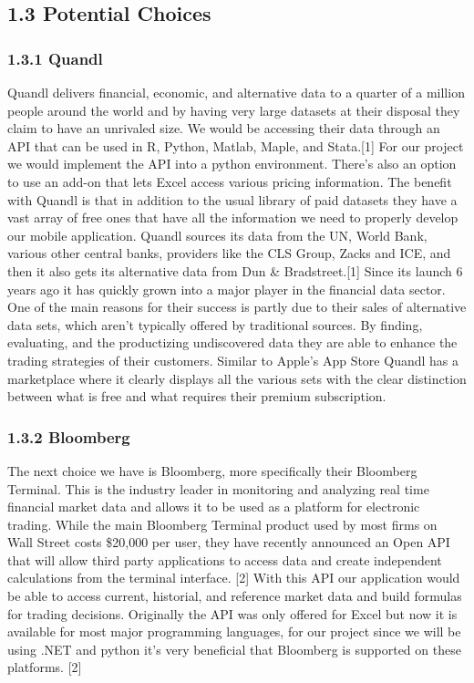 \documentclass[onecolumn, draftclsnofoot,10pt, compsoc]{IEEEtran}
\begin{document}
\subsection{1.3 Potential Choices}

\subsubsection{1.3.1 Quandl}
Quandl delivers financial, economic, and alternative data to a quarter of a million people around the world and by having very large datasets at their disposal they claim to have an unrivaled size. We would be accessing their data through an API that can be used in R, Python, Matlab, Maple, and Stata.[1] For our project we would implement the API into a python environment. There’s also an option to use an add-on that lets Excel access various pricing information. The benefit with Quandl is that in addition to the usual library of paid datasets they have a vast array of free ones that have all the information we need to properly develop our mobile application. Quandl sources its data from the UN, World Bank, various other central banks, providers like the CLS Group, Zacks and ICE, and then it also gets its alternative data from Dun \& Bradstreet.[1] Since its launch 6 years ago it has quickly grown into a major player in the financial data sector. One of the main reasons for their success is partly due to their sales of alternative data sets, which aren’t typically offered by traditional sources. By finding, evaluating, and the productizing undiscovered data they are able to enhance the trading strategies of their customers. Similar to Apple’s App Store Quandl has a marketplace where it clearly displays all the various sets with the clear distinction between what is free and what requires their premium subscription. 

\subsubsection{1.3.2 Bloomberg}
The next choice we have is Bloomberg, more specifically their Bloomberg Terminal. This is the industry leader in monitoring and analyzing real time financial market data and allows it to be used as a platform for electronic trading. While the main Bloomberg Terminal product used by most firms on Wall Street costs \$20,000 per user, they have recently announced an Open API that will allow third party applications to access data and create independent calculations from the terminal interface. [2] With this API our application would be able to access current, historial, and reference market data and build formulas for trading decisions. Originally the API was only offered for Excel but now it is available for most major programming languages, for our project since we will be using .NET and python it’s very beneficial that Bloomberg is supported on these platforms. [2]
\end{document}
